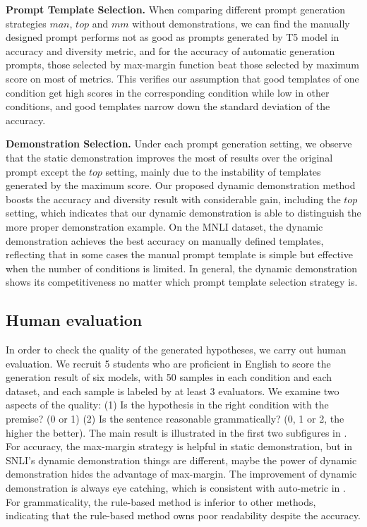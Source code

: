 \noindent
\textbf{Prompt Template Selection.}
When comparing different prompt generation strategies $man$, $top$ and $mm$ without demonstrations, we can find the manually designed prompt performs not as good as prompts generated by T5 model in accuracy and diversity metric, and for the accuracy of automatic generation prompts, those selected by max-margin function beat those selected by maximum score on most of metrics. This verifies our assumption that good templates of one condition get high scores in the corresponding condition while low in other conditions, and good templates narrow down the standard deviation of the accuracy.

\noindent
\textbf{Demonstration Selection.}
Under each prompt generation setting, we observe that the static demonstration improves the most of results over the original prompt except the $top$ setting, mainly due to the instability of templates generated by the maximum score. Our proposed dynamic demonstration method boosts the accuracy and diversity result with considerable gain, including the $top$ setting, which indicates that our dynamic demonstration is able to distinguish the more proper demonstration example. On the MNLI dataset, the dynamic demonstration achieves the best accuracy on manually defined templates, reflecting that in some cases the manual prompt template is simple but effective when the number of conditions is limited. In general, the dynamic demonstration shows its competitiveness no matter which prompt template selection strategy is.

\subsection{Human evaluation}
\label{sec:he}
In order to check the quality of the generated hypotheses, we carry out human evaluation. We recruit 5 students who are proficient in English to score the generation result of six models, with 50 samples in each condition and each dataset, and each sample is labeled by at least 3 evaluators. We examine two aspects of the quality: (1) Is the hypothesis in the right condition with the premise? (0 or 1) (2) Is the sentence reasonable grammatically? (0, 1 or 2, the higher the better). The main result is illustrated in the first two subfigures in . For accuracy, the max-margin strategy is helpful in static demonstration, but in SNLI's dynamic demonstration things are different, maybe the power of dynamic demonstration hides the advantage of max-margin. The improvement of dynamic demonstration is always eye catching, which is consistent with auto-metric in . For grammaticality, the rule-based method is inferior to other methods, indicating that the rule-based method owns poor readability despite the accuracy.


